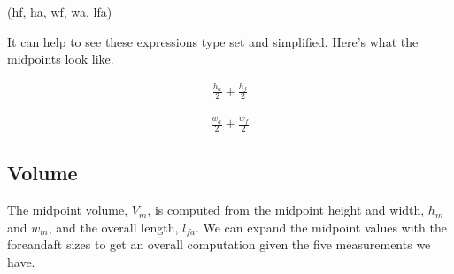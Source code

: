 \documentclass[letterpaper,10pt,english]{sphinxmanual}
\begin{document}
\begin{sphinxVerbatim}[commandchars=\\\{\}]
(h\PYGZus{}f, h\PYGZus{}a, w\PYGZus{}f, w\PYGZus{}a, l\PYGZus{}fa)
\end{sphinxVerbatim}

\begin{sphinxVerbatim}[commandchars=\\\{\}]
     
     
\end{sphinxVerbatim}

\sphinxAtStartPar
It can help to see these expressions type set and simplified. Here’s what the midpoints look like.

\begin{sphinxVerbatim}[commandchars=\\\{\}]
\end{sphinxVerbatim}
\begin{equation*}
\begin{split}\displaystyle \frac{h_{a}}{2} + \frac{h_{f}}{2}\end{split}
\end{equation*}
\begin{sphinxVerbatim}[commandchars=\\\{\}]
\end{sphinxVerbatim}
\begin{equation*}
\begin{split}\displaystyle \frac{w_{a}}{2} + \frac{w_{f}}{2}\end{split}
\end{equation*}

\subsection{Volume}
\label{\detokenize{prism:volume}}
\sphinxAtStartPar
The mid\sphinxhyphen{}point volume, \(V_m\), is computed from the midpoint height and width, \(h_m\) and \(w_m\), and the overall length, \(l_{fa}\). We can expand the midpoint values with the fore\sphinxhyphen{}and\sphinxhyphen{}aft sizes
to get an overall computation given the five measurements we have.
\end{document}
